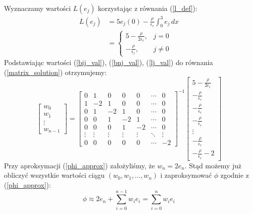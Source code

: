 \documentclass[a4paper,12pt]{article}
\begin{document}
    Wyznaczamy wartości \(L(e_j)\) korzystając z równania (\ref{l_def}):
    \begin{align}
        L(e_j) &= 5e_j(0) - \frac{\rho}{\epsilon_r} \int_{0}^{3} e_j\,dx \nonumber \\
        &=
        \begin{cases}
            5 - \frac{\rho}{2\epsilon_r},& j = 0 \\
            -\frac{\rho}{\epsilon_r},& j \neq 0
        \end{cases} \label{lj_val}
    \end{align}
    Podstawiając wartości (\ref{bij_val}), (\ref{bnj_val}), (\ref{lj_val}) do równania (\ref{matrix_solution}) otrzymujemy:
    \begin{equation}
        \begin{bmatrix}
            w_0 \\
            w_1 \\
            \vdots \\
            w_{n-1}
        \end{bmatrix}
        =
        \begin{bmatrix}
            0 &  1 &  0 &  0 &  0 & \cdots &  0 \\
            1 & -2 &  1 &  0 &  0 & \cdots &  0 \\
            0 &  1 & -2 &  1 &  0 & \cdots &  0 \\
            0 &  0 &  1 & -2 &  1 & \cdots &  0 \\
            0 &  0 &  0 &  1 & -2 & \cdots &  0 \\
            \vdots & \vdots & \vdots & \vdots & \vdots & \ddots & \vdots \\
            0 &  0 &  0 &  0 &  0 & \cdots & -2
        \end{bmatrix}
        ^{-1}
        \begin{bmatrix}
            5 - \frac{\rho}{2\epsilon_r} \\
            -\frac{\rho}{\epsilon_r} \\
            -\frac{\rho}{\epsilon_r} \\
            -\frac{\rho}{\epsilon_r} \\
            \vdots \\
            -\frac{\rho}{\epsilon_r} \\
            -\frac{\rho}{\epsilon_r}-2
        \end{bmatrix} \label{matrix_nums}
    \end{equation}
    Przy aproksymacji (\ref{phi_approx}) założyliśmy, że \(w_n = 2e_n\). Stąd możemy już obliczyć wszystkie wartości ciągu \((w_0, w_1, \ldots, w_n)\) i zaproksymować \(\phi\) zgodnie z (\ref{phi_approx}):
    \begin{equation}
        \phi \approx 2e_n + \sum_{i=0}^{n-1} w_i e_i = \sum_{i=0}^{n} w_i e_i
    \end{equation}
\end{document}
